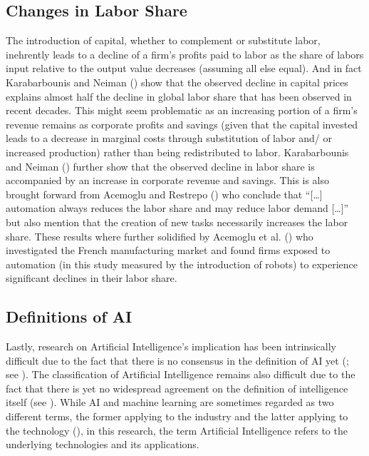 \documentclass[
  12pt,
  a4paperpaper,
]{article}
\begin{document}
\subsection{Changes in Labor Share}\label{changes-in-labor-share}

The introduction of capital, whether to complement or substitute labor,
inehrently leads to a decline of a firm's profits paid to labor as the
share of labors input relative to the output value decreases (assuming
all else equal). And in fact Karabarbounis and Neiman
() show that the
observed decline in capital prices explains almost half the decline in
global labor share that has been observed in recent decades. This might
seem problematic as an increasing portion of a firm's revenue remains as
corporate profits and savings (given that the capital invested leads to
a decrease in marginal costs through substitution of labor and/ or
increased production) rather than being redistributed to labor.
Karabarbounis and Neiman () further show that the observed decline in labor share is
accompanied by an increase in corporate revenue and savings. This is
also brought forward from Acemoglu and Restrepo
() who conclude that
``{[}\ldots{]} automation always reduces the labor share and may reduce
labor demand {[}\ldots{]}'' but also mention that the creation of new
tasks necessarily increases the labor share. These results where further
solidified by Acemoglu et al.
() who investigated
the French manufacturing market and found firms exposed to automation
(in this study measured by the introduction of robots) to experience
significant declines in their labor share.

\subsection{Definitions of AI}\label{sec-definitions-of-ai}

Lastly, research on Artificial Intelligence's implication has been
intrinsically difficult due to the fact that there is no consensus in
the definition of AI yet (; see ). The classification of Artificial Intelligence remains also
difficult due to the fact that there is yet no widespread agreement on
the definition of intelligence itself (see
). While AI
and machine learning are sometimes regarded as two different terms, the
former applying to the industry and the latter applying to the
technology (),
in this research, the term Artificial Intelligence refers to the
underlying technologies and its applications.
\end{document}

